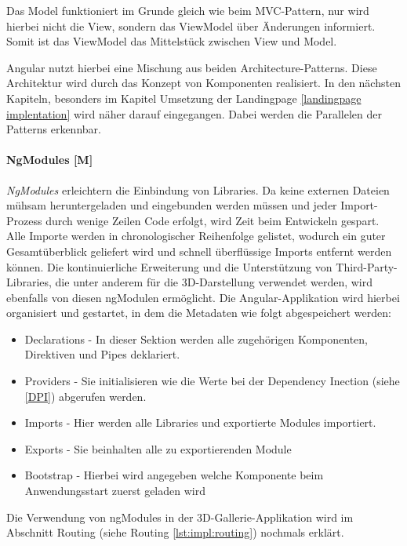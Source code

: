 Das Model funktioniert im Grunde gleich wie beim MVC-Pattern, nur wird hierbei nicht die View, sondern das ViewModel über Änderungen informiert. Somit ist das ViewModel das Mittelstück zwischen View und Model.

Angular nutzt hierbei eine Mischung aus beiden Architecture-Patterns. Diese Architektur wird durch das Konzept von Komponenten realisiert. In den nächsten Kapiteln, besonders im Kapitel Umsetzung der Landingpage \ref{landingpage implentation} wird näher darauf eingegangen. Dabei werden die Parallelen der Patterns erkennbar.
\cite{MVVM}

\paragraph{NgModules [M]}\label{sec:NgModules}
\emph{NgModules} erleichtern die Einbindung von Libraries. Da keine externen Dateien mühsam heruntergeladen und eingebunden werden müssen und jeder Import-Prozess durch wenige Zeilen Code erfolgt, wird Zeit beim Entwickeln gespart. Alle Importe werden in chronologischer Reihenfolge gelistet, wodurch ein guter Gesamtüberblick geliefert wird und schnell überflüssige Imports entfernt werden können. Die kontinuierliche Erweiterung und die Unterstützung von Third-Party-Libraries, die unter anderem für die 3D-Darstellung verwendet werden, wird ebenfalls von diesen ngModulen ermöglicht. Die Angular-Applikation wird hierbei organisiert und gestartet, in dem die Metadaten wie folgt abgespeichert werden:

\begin{itemize}
  \item Declarations - In dieser Sektion werden alle zugehörigen Komponenten, Direktiven und Pipes deklariert. 
  \item Providers - Sie initialisieren wie die Werte bei der Dependency Inection (siehe \ref{DPI}) abgerufen werden. \cite{AngularProviders}
  \item Imports - Hier werden alle Libraries und exportierte Modules importiert.
  \item Exports - Sie beinhalten alle zu exportierenden Module
  \item Bootstrap - Hierbei wird angegeben welche Komponente beim Anwendungsstart zuerst geladen wird
\end{itemize}

Die Verwendung von ngModules in der 3D-Gallerie-Applikation wird im Abschnitt Routing (siehe Routing \ref{lst:impl:routing}) nochmals erklärt.
\cite{AngularNgModules}
\cite{AngularNgModulesAPI}
\cite{AngularBuch}



